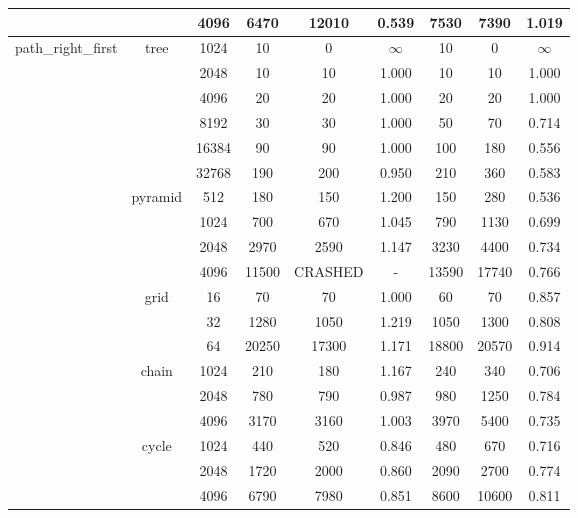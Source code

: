 \begin{table}[ht]
{\begin{tabular}{c|c|c|c|c|c|c|c|c}
   &  &  4096 &  6470 & 12010 &  0.539  & 7530 & 7390 &  1.019 \\
   \cline{2-9}
   \hline
   \multirow{19}{*}{path\_right\_first} &  \multirow{6}{*}{tree} &  1024 &  10 & 0 &  $\infty$  & 10 & 0 &  $\infty$ \\
   &  &  2048 &  10 & 10 &  1.000  & 10 & 10 &  1.000 \\
   &  &  4096 &  20 & 20 &  1.000  & 20 & 20 &  1.000 \\
   &  &  8192 &  30 & 30 &  1.000  & 50 & 70 &  0.714 \\
   &  &  16384 &  90 & 90 &  1.000  & 100 & 180 &  0.556 \\
   &  &  32768 &  190 & 200 &  0.950  & 210 & 360 &  0.583 \\
   \cline{2-9}
   &  \multirow{4}{*}{pyramid} &  512 &  180 & 150 &  1.200  & 150 & 280 &  0.536 \\
   &  &  1024 &  700 & 670 &  1.045  & 790 & 1130 &  0.699 \\
   &  &  2048 &  2970 & 2590 &  1.147  & 3230 & 4400 &  0.734 \\
   &  &  4096 &  11500 & CRASHED &  -  & 13590 & 17740 &  0.766 \\
   \cline{2-9}
   &  \multirow{3}{*}{grid} &  16 &  70 & 70 &  1.000  & 60 & 70 &  0.857 \\
   &  &  32 &  1280 & 1050 &  1.219  & 1050 & 1300 &  0.808 \\
   &  &  64 &  20250 & 17300 &  1.171  & 18800 & 20570 &  0.914 \\
   \cline{2-9}
   &  \multirow{3}{*}{chain} &  1024 &  210 & 180 &  1.167  & 240 & 340 &  0.706 \\
   &  &  2048 &  780 & 790 &  0.987  & 980 & 1250 &  0.784 \\
   &  &  4096 &  3170 & 3160 &  1.003  & 3970 & 5400 &  0.735 \\
   \cline{2-9}
   &  \multirow{3}{*}{cycle} &  1024 &  440 & 520 &  0.846  & 480 & 670 &  0.716 \\
   &  &  2048 &  1720 & 2000 &  0.860  & 2090 & 2700 &  0.774 \\
   &  &  4096 &  6790 & 7980 &  0.851  & 8600 & 10600 &  0.811 \\
   \cline{2-9}
   \hline
\end{tabular}
}
\end{table}

